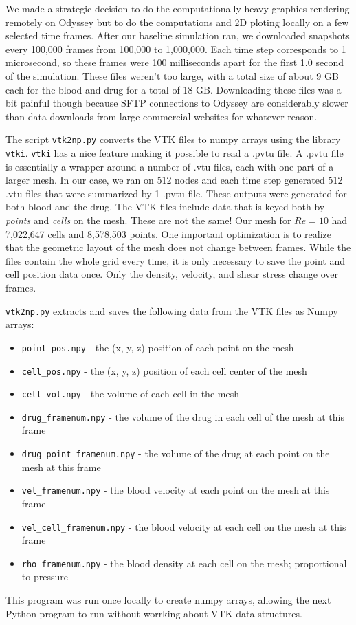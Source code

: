 \documentclass[11pt]{article} %
\newcommand{\tty}[1]{\texttt{#1}}
\begin{document}
We made a strategic decision to do the computationally heavy graphics rendering remotely on Odyssey
but to do the computations and 2D ploting locally on a few selected time frames.
After our baseline simulation ran, we downloaded snapshots every 100,000 frames from 100,000 to 1,000,000.
Each time step corresponds to 1 microsecond, so these frames were 100 milliseconds apart for
the first 1.0 second of the simulation.  
These files weren't too large, with a total size of about 9 GB each for the blood and drug for a total of 18 GB.
Downloading these files was a bit painful though because SFTP connections to Odyssey 
are considerably slower than data downloads from large commercial websites for whatever reason.

The script \tty{vtk2np.py} converts the VTK files to numpy arrays using the library \tty{vtki}.
\tty{vtki} has a nice feature making it possible to read a .pvtu file.  
A .pvtu file is essentially a wrapper around a number of .vtu files, each with one part of a larger mesh.  
In our case, we ran on 512 nodes and each time step generated 512 .vtu files that were summarized by 1 .pvtu file.  
These outputs were generated for both blood and the drug.
The VTK files include data that is keyed both by \textit{points} and \textit{cells} on the mesh.
These are not the same! Our mesh for $Re=10$ had 7,022,647 cells and 8,578,503 points.
One important optimization is to realize that the geometric layout of the mesh does not change between frames.  
While the files contain the whole grid every time, it is only necessary to save the point and cell position data once.  
Only the density, velocity, and shear stress change over frames.

\tty{vtk2np.py} extracts and saves the following data from the VTK files as Numpy arrays:
\begin{itemize}
\item \tty{point\_pos.npy} - the (x, y, z) position of each point on the mesh
\item \tty{cell\_pos.npy} - the (x, y, z) position of each cell center of the mesh
\item \tty{cell\_vol.npy} - the volume of each cell in the mesh
\item \tty{drug\_framenum.npy} - the volume of the drug in each cell of the mesh at this frame
\item \tty{drug\_point\_framenum.npy} - the volume of the drug at each point on the mesh at this frame
\item \tty{vel\_framenum.npy} - the blood velocity at each point on the mesh at this frame
\item \tty{vel\_cell\_framenum.npy} - the blood velocity at each cell on the mesh at this frame
\item \tty{rho\_framenum.npy} - the blood density at each cell on the mesh; proportional to pressure
\end{itemize}
This program was run once locally to create numpy arrays, allowing the
next Python program to run without worrking about VTK data structures.
\end{document}
